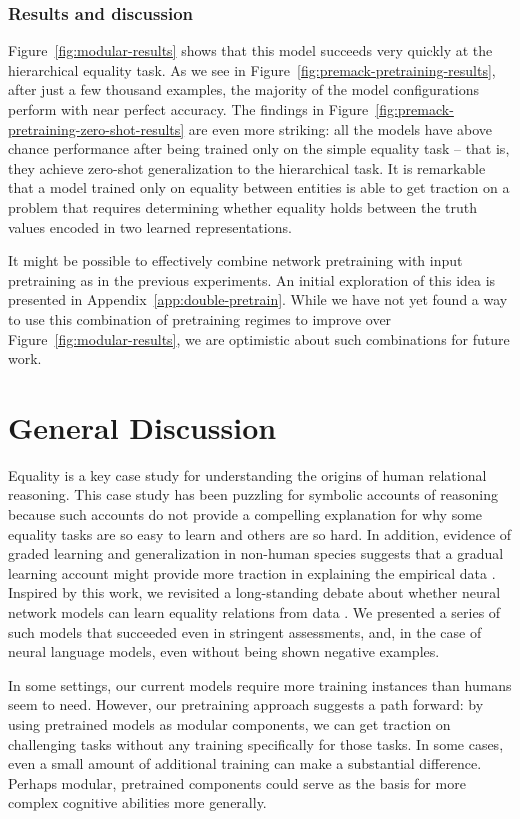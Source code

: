 \documentclass{article}
\newcommand{\Figref}[1]{Figure~\ref{#1}}
\newcommand{\figref}[1]{Figure~\ref{#1}}
\newcommand{\appref}[1]{Appendix~\ref{#1}}
\renewcommand{\cite}{\citep}
\begin{document}
\subsubsection{Results and discussion}

\Figref{fig:modular-results} shows that this model succeeds very quickly at the hierarchical equality task. As we see in \figref{fig:premack-pretraining-results}, after just a few thousand examples, the majority of the model configurations perform with near perfect accuracy. The findings in \figref{fig:premack-pretraining-zero-shot-results} are even more striking: all the models have above chance performance after being trained only on the simple equality task -- that is, they achieve zero-shot generalization to the hierarchical task. It is remarkable that a model trained only on equality between entities is able to get traction on a problem that requires determining whether equality holds between the truth values encoded in two learned representations.

It might be possible to effectively combine network pretraining with input pretraining as in the previous experiments. An initial exploration of this idea is presented in \appref{app:double-pretrain}. While we have not yet found a way to use this combination of pretraining regimes to improve over \figref{fig:modular-results}, we are optimistic about such combinations for future work.

\section{General Discussion}

Equality is a key case study for understanding the origins of human relational reasoning. This case study has been puzzling for symbolic accounts of reasoning because such accounts do not provide a compelling explanation for why some equality tasks are so easy to learn and others are so hard. In addition, evidence of graded learning and generalization in non-human species suggests that a gradual learning account might provide more traction in explaining the empirical data \cite{wasserman:2017}. Inspired by this work, we revisited a long-standing debate about whether neural network models can learn equality relations from data \cite{alhama:2019}. We presented a series of such models that succeeded even in stringent assessments, and, in the case of neural language models, even without being shown negative examples.

In some settings, our current models require more training instances than humans seem to need. However, our pretraining approach suggests a path forward: by using pretrained models as modular components, we can get traction on challenging tasks without any training specifically for those tasks. In some cases, even a small amount of additional training can make a substantial difference. Perhaps modular, pretrained components could serve as the basis for more complex cognitive abilities more generally.
\end{document}
